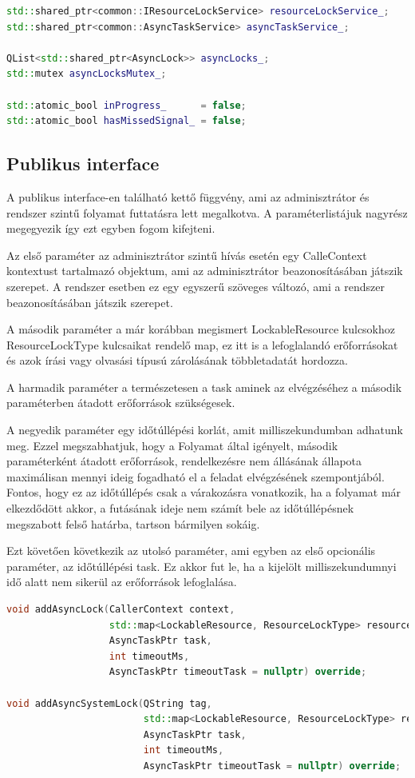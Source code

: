 \begin{lstlisting}[language={C++}]
std::shared_ptr<common::IResourceLockService> resourceLockService_;
std::shared_ptr<common::AsyncTaskService> asyncTaskService_;

QList<std::shared_ptr<AsyncLock>> asyncLocks_;
std::mutex asyncLocksMutex_;

std::atomic_bool inProgress_      = false;
std::atomic_bool hasMissedSignal_ = false;
\end{lstlisting}

\subsection{Publikus interface}

A publikus interface-en található kettő függvény, ami az adminisztrátor és rendszer szintű folyamat futtatásra lett megalkotva. A paraméterlistájuk nagyrész megegyezik így ezt egyben fogom kifejteni.

Az első paraméter az adminisztrátor szintű hívás esetén egy CalleContext kontextust tartalmazó objektum, ami az adminisztrátor beazonosításában játszik szerepet. A rendszer esetben ez egy egyszerű szöveges változó, ami a rendszer beazonosításában játszik szerepet.

A második paraméter a már korábban megismert LockableResource kulcsokhoz ResourceLockType kulcsaikat rendelő map, ez itt is a lefoglalandó erőforrásokat és azok írási vagy olvasási típusú zárolásának többletadatát hordozza.

A harmadik paraméter a természetesen a task aminek az elvégzéséhez a második paraméterben átadott erőforrások szükségesek. 

A negyedik paraméter egy időtúllépési korlát, amit milliszekundumban adhatunk meg. Ezzel megszabhatjuk, hogy a Folyamat által igényelt, második paraméterként átadott erőforrások, rendelkezésre nem állásának állapota maximálisan mennyi ideig fogadható el a feladat elvégzésének szempontjából. Fontos, hogy ez az időtúllépés csak a várakozásra vonatkozik, ha a folyamat már elkezdődött akkor, a futásának ideje nem számít bele az időtúllépésnek megszabott felső határba, tartson bármilyen sokáig.

Ezt követően következik az utolsó paraméter, ami egyben az első opcionális paraméter, az időtúllépési task. Ez akkor fut le, ha a kijelölt milliszekundumnyi idő alatt nem sikerül az erőforrások lefoglalása.

\begin{lstlisting}[language={C++}]
void addAsyncLock(CallerContext context,
                  std::map<LockableResource, ResourceLockType> resources,
                  AsyncTaskPtr task,
                  int timeoutMs,
                  AsyncTaskPtr timeoutTask = nullptr) override;

void addAsyncSystemLock(QString tag,
                        std::map<LockableResource, ResourceLockType> resources,
                        AsyncTaskPtr task,
                        int timeoutMs,
                        AsyncTaskPtr timeoutTask = nullptr) override;
\end{lstlisting}

